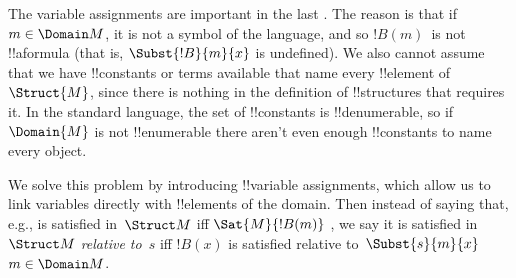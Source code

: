 \documentclass[../../../include/open-logic-section]{subfiles}
\begin{document}
\begin{explain}
The variable assignments are important in the last
. The reason is that if $m \in
\Domain M$, it is not a symbol of the language, and so $!B(m)$~is not
!!a{formula} (that is, $\Subst{!B}{m}{x}$ is undefined).  We also
cannot assume that we have !!{constant}s or terms available that name
every !!{element} of~$\Struct{M}$, since there is nothing in the
definition of !!{structure}s that requires it.  In the standard
language, the set of !!{constant}s is !!{denumerable}, so if
$\Domain{M}$ is not !!{enumerable} there aren't even enough
!!{constant}s to name every object. 

We solve this problem by introducing !!{variable} assignments, which
allow us to link variables directly with !!{element}s of the domain.
Then instead of saying that, e.g.,
 is satisfied
in~$\Struct M$ iff $\Sat{M}{!B(m)}$ , we say it
is satisfied in~$\Struct M$ \emph{relative to}~$s$ iff $!B(x)$ is
satisfied relative to~$\Subst{s}{m}{x}$  $m \in \Domain M$.
\end{explain}
\end{document}
